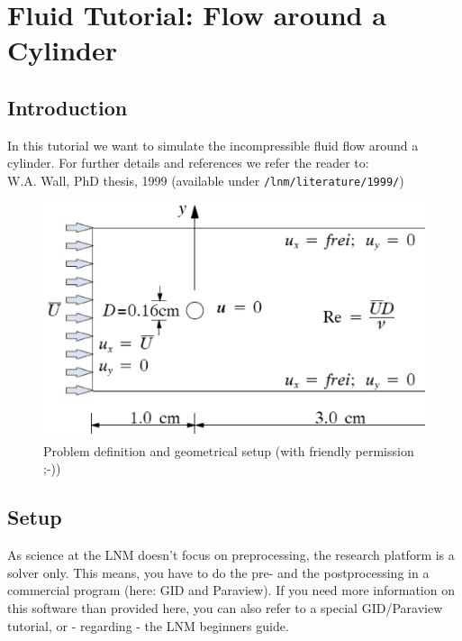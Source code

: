 \chapter{Fluid Tutorial: Flow around a Cylinder}
\label{tut_fluid:chap}

\section{Introduction}
In this tutorial we want to simulate the incompressible fluid flow around a cylinder.
For further details and references we refer the reader to:\\
W.A. Wall, PhD thesis, 1999
(available under \texttt{/lnm/literature/1999/})
\begin{figure}[h]
\begin{center}
 \includegraphics[scale=0.35]{pics/tut_fluid_problem}
 \caption{Problem definition and geometrical setup (with friendly permission ;-))}
\label{fig:tut_fluid_setup}
\end{center}
\end{figure}

\section{\baci{} Setup}

As science at the LNM doesn't focus on preprocessing, the 
research platform \baci{} is a solver only.
This means, you have to do the pre- and the postprocessing in a commercial
program (here: GID and Paraview). 
If you need more information on this software than provided here,
you can also refer to a special GID/Paraview tutorial, or - regarding
\baci{} - the LNM beginners guide.

